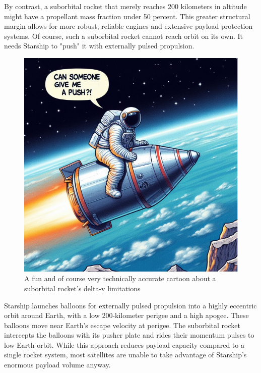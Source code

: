 \documentclass{article}
\begin{document}
{By contrast, a suborbital rocket that merely reaches 200 kilometers in altitude might have a propellant mass fraction under 50 percent. This greater structural margin allows for more robust, reliable engines and extensive payload protection systems. Of course, such a suborbital rocket cannot reach orbit on its own.  It needs Starship to "push" it with externally pulsed propulsion.
\begin{figure}[htpb]
    \centering
    \includegraphics[width=0.5\linewidth]{images/suborbital_push_cartoon.png}
    \caption{A fun and of course very technically accurate cartoon about a suborbital rocket's delta-v limitations}
    \label{fig:suborbital-cartoon}
\end{figure}



Starship launches balloons for externally pulsed propulsion into a highly eccentric orbit around Earth, with a low 200-kilometer perigee and a high apogee. These balloons move near Earth’s escape velocity at perigee. The suborbital rocket intercepts the balloons with its pusher plate and rides their momentum pulses to low Earth orbit. While this approach reduces payload capacity compared to a single rocket system, most satellites are unable to take advantage of Starship’s enormous payload volume anyway.

}
\end{document}
